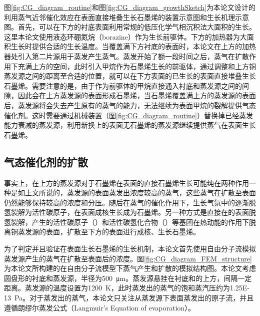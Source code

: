     图\ref{fig:CG_diagram_routine}和图\ref{fig:CG_diagram_growthSketch}为本论文设计的利用蒸气近邻催化效应在表面直接堆叠生长石墨烯的装置示意图和生长机理示意图。首先，可以在下方的衬底表面利用常规的低压化学气相沉积法大面积的生长。这里本论文使用液态环硼氮烷（borazine）作为生长前驱体。下方的加热器为大面积生长时提供合适的生长温度。当覆盖满下方衬底的表面时，本论文在上方的加热器处引入第二片源用于蒸发产生蒸气。蒸发开始了额一段时间之后，蒸气在扩散作用下充满上方的空间，此时引入甲烷作为石墨烯生长的前驱体，通过调整和上方铜蒸发源之间的距离至合适的位置，就可以在下方表面的已生长的表面直接堆叠生长石墨烯。需要注意的是，由于作为前驱体的甲烷直接通入衬底和蒸发源之间的间隙，因此会在上方蒸发源的表面形成石墨烯，当石墨烯覆盖满上方的蒸发源的表面后，蒸发源将会失去产生原有的蒸气的能力，无法继续为表面甲烷的裂解提供气态催化剂。这时需要通过机械装置（图\ref{fig:CG_diagram_routine}）替换掉已经蒸发能力衰减的蒸发源，利用新换上的表面无石墨烯的蒸发源继续提供蒸气在表面生长石墨烯。

    \subsection{气态催化剂的扩散}
    \label{CG:FEM_CuVapor}
    事实上，在上方的蒸发源对于石墨烯在表面的直接石墨烯生长可能纯在两种作用\chinesecolon 一种是如上文所说的，蒸发源的表面蒸发出浓度较高的蒸气，这些蒸气在扩散至表面仍然能够保持较高的浓度和分压。随后在蒸气的催化作用下，生长气氛中的逐渐脱氢裂解为活性碳原子，在表面成核生长成为石墨烯。另一种方式是直接在的表面脱氢裂解，产生的活性碳原子（）和活性碳氢化合物（）等基团在热动能的作用下脱离铜蒸发源的表面，扩散至下方的表面进行成核、生长石墨烯。

    为了判定并且验证在表面生长石墨烯的生长机制，本论文首先使用自由分子流模拟蒸发源产生的蒸气在扩散至表面后的浓度。图\ref{fig:CG_diagram_FEM_structure}为本论文所构建的在自由分子流模型下蒸气产生和扩散的模拟结构图。本论文考虑圆盘形的衬底和蒸发源，半径为\SI{500}{\micro\meter}。蒸发源悬挂在衬底和的上方，间隔一定距离。蒸发源的温度设置为\SI{1200}{\kelvin}，此时蒸发出的蒸气的饱和蒸汽压约为\SI{1.25E-13}{\pascal}。对于蒸发出的蒸气，本论文只关注从蒸发源下表面蒸发出的原子流，并且遵循朗缪尔蒸发公式（Langmuir’s Equation of evaporation）。
    
